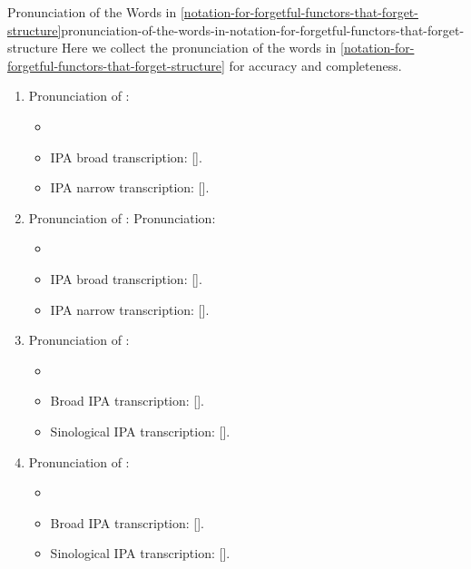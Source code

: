 \begin{remark}{Pronunciation of the Words in \cref{notation-for-forgetful-functors-that-forget-structure}}{pronunciation-of-the-words-in-notation-for-forgetful-functors-that-forget-structure}%
    Here we collect the pronunciation of the words in \cref{notation-for-forgetful-functors-that-forget-structure} for accuracy and completeness.
    \begin{enumerate}
        \item\label{pronunciation-of-the-words-in-notation-for-forgetful-functors-that-forget-structure-wasureru}Pronunciation of :
            \begin{itemize}
                \item {}
                \item IPA broad transcription: [].
                \item IPA narrow transcription: [].
            \end{itemize}
        \item\label{pronunciation-of-the-words-in-notation-for-forgetful-functors-that-forget-structure-boukyaku-kanshu}Pronunciation of :
            Pronunciation:
            \begin{itemize}
                \item {}
                \item IPA broad transcription: [].
                \item IPA narrow transcription: [].
            \end{itemize}
        \item\label{pronunciation-of-the-words-in-notation-for-forgetful-functors-that-forget-structure-wang-ji}Pronunciation of :
            \begin{itemize}
                \item {}
                \item Broad IPA transcription: [].
                \item Sinological IPA transcription: [].
            \end{itemize}
        \item\label{pronunciation-of-the-words-in-notation-for-forgetful-functors-that-forget-structure-yiwang-hanzi}Pronunciation of :
            \begin{itemize}
                \item {}
                \item Broad IPA transcription: [].
                \item Sinological IPA transcription: [].
            \end{itemize}
    \end{enumerate}
\end{remark}
